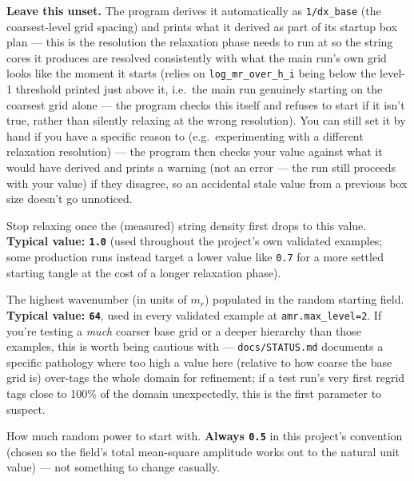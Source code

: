 \documentclass[11pt]{article}
\begin{document}
\begin{description}[style=nextline,leftmargin=1.2em,itemsep=0.4em]
\item[\texttt{axion\_strings.pre\_evolution.gamma}]
  \textbf{Leave this unset.} The program derives it automatically as \texttt{1/dx\_base} (the coarsest-level
  grid spacing) and prints what it derived as part of its startup box plan --- this is the resolution the
  relaxation phase needs to run at so the string cores it produces are resolved consistently with what the
  main run's own grid looks like the moment it starts (relies on \texttt{log\_mr\_over\_h\_i} being below
  the level-1 threshold printed just above it, i.e.\ the main run genuinely starting on the coarsest grid
  alone --- the program checks this itself and refuses to start if it isn't true, rather than silently
  relaxing at the wrong resolution). You can still set it by hand if you have a specific reason to (e.g.\
  experimenting with a different relaxation resolution) --- the program then checks your value against what
  it would have derived and prints a warning (not an error --- the run still proceeds with your value) if
  they disagree, so an accidental stale value from a previous box size doesn't go unnoticed.
\item[\texttt{axion\_strings.pre\_evolution.xi\_target}]
  Stop relaxing once the (measured) string density first drops to this value. \textbf{Typical value:
  \texttt{1.0}} (used throughout the project's own validated examples; some production runs instead target
  a lower value like \texttt{0.7} for a more settled starting tangle at the cost of a longer relaxation
  phase).
\item[\texttt{axion\_strings.pre\_evolution.k\_max\_over\_mr}]
  The highest wavenumber (in units of $m_r$) populated in the random starting field. \textbf{Typical value:
  \texttt{64}}, used in every validated example at \texttt{amr.max\_level=2}. If you're testing a
  \emph{much} coarser base grid or a deeper hierarchy than those examples, this is worth being cautious
  with --- \texttt{docs/STATUS.md} documents a specific pathology where too high a value here (relative to
  how coarse the base grid is) over-tags the whole domain for refinement; if a test run's very first regrid
  tags close to 100\% of the domain unexpectedly, this is the first parameter to suspect.
\item[\texttt{axion\_strings.pre\_evolution.mean\_square\_variance}]
  How much random power to start with. \textbf{Always \texttt{0.5}} in this project's convention (chosen
  so the field's total mean-square amplitude works out to the natural unit value) --- not something to
  change casually.
\end{description}
\end{document}
